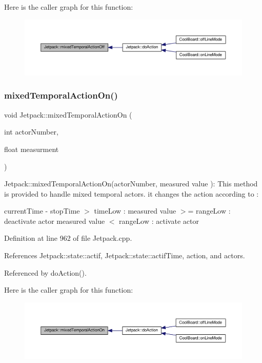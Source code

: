 Here is the caller graph for this function\+:
\nopagebreak
\begin{figure}[H]
\begin{center}
\leavevmode
\includegraphics[width=350pt]{df/d1d/class_jetpack_af2f567ef6311a8fc2f7bb948837667b7_icgraph}
\end{center}
\end{figure}
\mbox{\label{class_jetpack_af44bc8a08818e4433dfb1c7104601f12}} 
\subsubsection{\texorpdfstring{mixed\+Temporal\+Action\+On()}{mixedTemporalActionOn()}}
{\footnotesize\ttfamily void Jetpack\+::mixed\+Temporal\+Action\+On (\begin{DoxyParamCaption}\item[{int}]{actor\+Number,  }\item[{float}]{measurment }\end{DoxyParamCaption})}

Jetpack\+::mixed\+Temporal\+Action\+On(actor\+Number, measured value )\+: This method is provided to handle mixed temporal actors. it changes the action according to \+:

current\+Time -\/ stop\+Time $>$ time\+Low \+: measured value $>$= range\+Low \+: deactivate actor measured value $<$ range\+Low \+: activate actor 

Definition at line 962 of file Jetpack.\+cpp.



References Jetpack\+::state\+::actif, Jetpack\+::state\+::actif\+Time, action, and actors.



Referenced by do\+Action().

Here is the caller graph for this function\+:
\nopagebreak
\begin{figure}[H]
\begin{center}
\leavevmode
\includegraphics[width=350pt]{df/d1d/class_jetpack_af44bc8a08818e4433dfb1c7104601f12_icgraph}
\end{center}
\end{figure}
\mbox{\label{class_jetpack_acd6889af2fe5b057c6bd51b6dac827ef}} 
